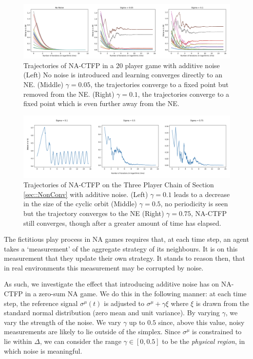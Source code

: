 \documentclass{article}
\theoremstyle{definition}
\newcommand{\refmu}{\sigma^{\mu}}
\begin{document}
  \begin{figure}[t]
    \centering
    \includegraphics[width = \columnwidth]{Figures/Noise20Player.png}
    \caption{\label{fig::Noise20Player} Trajectories of NA-CTFP in a 20 player game with additive noise (Left) No noise is introduced and learning converges directly to an NE. (Middle) $\gamma = 0.05$, the trajectories converge to a fixed point but removed from the NE. (Right) $\gamma = 0.1$, the trajectories converge to a fixed point which is even further away from the NE.}
  \end{figure}

  \begin{figure}[t]
    \centering
    \includegraphics[width = \columnwidth]{Figures/3PlayerChainNoise.png}
    \caption{\label{fig::3PlayerChainNoise} Trajectories of NA-CTFP on the Three Player Chain of Section \ref{sec::NonConv} with additive noise. (Left) $\gamma = 0.1$ leads to a decrease in the size of the cyclic orbit (Middle) $\gamma = 0.5$, no periodicity is seen but the trajectory converges to the NE (Right) $\gamma = 0.75$, NA-CTFP still converges, though after a greater amount of time has elapsed.}
  \end{figure}

  The fictitious play process in NA games requires that, at each time step, an agent takes a
  `measurement' of the aggregate strategy of its neighbours. It is on this measurement that they
  update their own strategy. It stands to reason then, that in real environments this measurement
  may be corrupted by noise. 
  
  As such, we investigate the effect that introducing additive noise has
  on NA-CTFP in a zero-sum NA game. We do this in the following manner: at each time step, the
  reference signal $\refmu(t)$ is adjusted to $\refmu + \gamma \xi$ where $\xi$ is drawn from the
  standard normal distribution (zero mean and unit variance). By varying $\gamma$, we vary the
  strength of the noise. We vary $\gamma$ up to $0.5$ since, above this value, noisy measurements
  are likely to lie outside of the simplex. Since $\refmu$ is constrained to lie within $\Delta$, we
  can consider the range $\gamma \in [0, 0.5]$ to be the \emph{physical region}, in which noise is meaningful.
\end{document}
